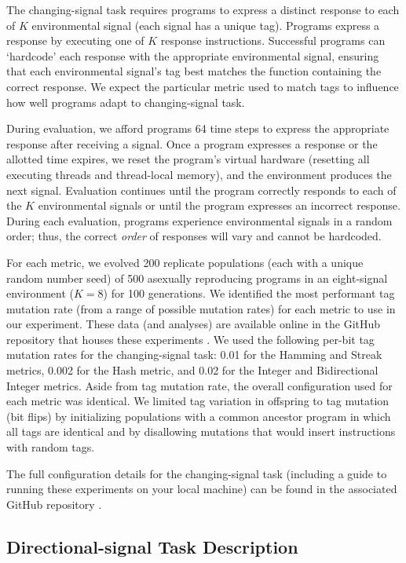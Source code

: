 The changing-signal task requires programs to express a distinct response to each of $K$ environmental signal (each signal has a unique tag).
Programs express a response by executing one of $K$ response instructions.
Successful programs can `hardcode' each response with the appropriate environmental signal, ensuring that each environmental signal's tag best matches the function containing the correct response.
We expect the particular metric used to match tags to influence how well programs adapt to changing-signal task.

During evaluation, we afford programs 64 time steps to express the appropriate response after receiving a signal.
Once a program expresses a response or the allotted time expires, we reset the program's virtual hardware (resetting all executing threads and thread-local memory), and the environment produces the next signal.
Evaluation continues until the program correctly responds to each of the $K$ environmental signals or until the program expresses an incorrect response.
During each evaluation, programs experience environmental signals in a random order; thus, the correct \textit{order} of responses will vary and cannot be hardcoded.

For each metric, we evolved 200 replicate populations (each with a unique random number seed) of 500 asexually reproducing programs in an eight-signal environment ($K=8$) for 100 generations.
We identified the most performant tag mutation rate (from a range of possible mutation rates) for each metric to use in our experiment.
These data (and analyses) are available online in the GitHub repository that houses these experiments .
We used the following per-bit tag mutation rates for the changing-signal task: 0.01 for the Hamming and Streak metrics, 0.002 for the Hash metric, and 0.02 for the Integer and Bidirectional Integer metrics.
Aside from tag mutation rate, the overall configuration used for each metric was identical.
We limited tag variation in offspring to tag mutation (bit flips) by initializing populations with a common ancestor program in which all tags are identical and by disallowing mutations that would insert instructions with random tags.

The full configuration details for the changing-signal task (including a guide to running these experiments on your local machine) can be found in the associated GitHub repository .

\subsection{Directional-signal Task Description}


